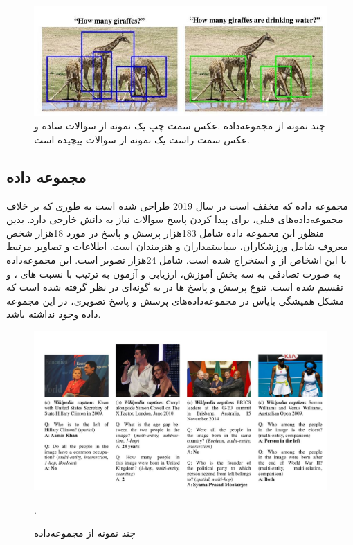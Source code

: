    \begin{figure}[h]
		\centerline{\includegraphics[scale=0.8]{images/TallyQA.JPG}}
		\caption[چند نمونه از مجموعه‌داده]{چند نمونه از مجموعه‌داده \cite{acharya2019tallyqa}.عکس سمت چپ یک نمونه از سوالات ساده و عکس سمت راست یک نمونه از سوالات پیچیده است.}
		\label{fig:TallyQAExample}
	\end{figure}

\subsection[مجموعه داده \lr{KVQA}]{مجموعه داده \cite{shah2019kvqa}}
	مجموعه داده 
	 که مخفف
	است در سال 2019 طراحی شده است به طوری که بر خلاف مجموعه‌داده‌های قبلی، برای پیدا کردن پاسخ سوالات نیاز به دانش خارجی دارد. بدین منظور این مجموعه داده شامل 183هزار پرسش و پاسخ در مورد 18هزار شخص معروف شامل ورزشکاران، سیاستمداران و هنرمندان است.  اطلاعات و تصاویر مرتبط با این  اشخاص از
	و
	استخراج شده است.
شامل 24هزار تصویر است. این مجموعه‌داده به صورت تصادفی به سه بخش آموزش، ارزیابی و آزمون به ترتیب با نسبت های
 	، 
  و
   تقسیم شده است. تنوع پرسش و پاسخ ها در 
	به گونه‌ای در نظر گرفته شده است که مشکل همیشگی بایاس در مجموعه‌داده‌های پرسش و پاسخ تصویری، در این مجموعه داده وجود نداشته باشد.
   \begin{figure}[h]
		\centerline{\includegraphics[scale=0.4]{images/KVQA.JPG}}
		\caption[چند نمونه از مجموعه‌داده]{چند نمونه از مجموعه‌داده \cite{shah2019kvqa}}.
		\label{fig:KVQAExample}
    \end{figure}

